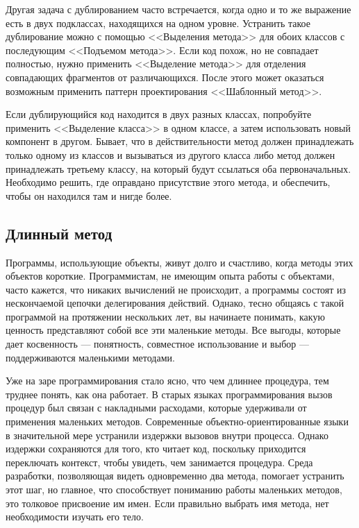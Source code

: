 \documentclass{../../text-style}
\begin{document}
Другая задача с дублированием часто встречается, когда одно и то же выражение есть в двух подклассах, находящихся на одном уровне. Устранить такое дублирование можно с помощью <<Выделения метода>> для обоих классов с последующим <<Подъемом метода>>. Если код похож, но не совпадает полностью, нужно применить <<Выделение метода>> для отделения совпадающих фрагментов от различающихся. После этого может оказаться возможным применить паттерн проектирования <<Шаблонный метод>>. 

Если дублирующийся код находится в двух разных классах, попробуйте применить <<Выделение класса>> в одном классе, а затем использовать новый компонент в другом. Бывает, что в действительности метод должен принадлежать только одному из классов и вызываться из другого класса либо метод должен принадлежать третьему классу, на который будут ссылаться оба первоначальных. Необходимо решить, где оправдано присутствие этого метода, и обеспечить, чтобы он находился там и нигде более.

\subsection{Длинный метод}

Программы, использующие объекты, живут долго и счастливо, когда методы этих объектов короткие. Программистам, не имеющим опыта работы с объектами, часто кажется, что никаких вычислений не происходит, а программы состоят из нескончаемой цепочки делегирования действий. Однако, тесно общаясь с такой программой на протяжении нескольких лет, вы начинаете понимать, какую ценность представляют собой все эти маленькие методы. Все выгоды, которые дает косвенность --- понятность, совместное использование и выбор --- поддерживаются маленькими методами.

Уже на заре программирования стало ясно, что чем длиннее процедура, тем труднее понять, как она работает. В старых языках программирования вызов процедур был связан с накладными расходами, которые удерживали от применения маленьких методов. Современные объектно-ориентированные языки в значительной мере устранили издержки вызовов внутри процесса. Однако издержки сохраняются для того, кто читает код, поскольку приходится переключать контекст, чтобы увидеть, чем занимается процедура. Среда разработки, позволяющая видеть одновременно два метода, помогает устранить этот шаг, но главное, что способствует пониманию работы маленьких методов, это толковое присвоение им имен. Если правильно выбрать имя метода, нет необходимости изучать его тело.
\end{document}
